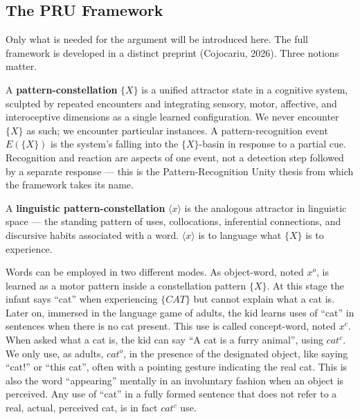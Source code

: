 \documentclass[12pt,a4paper]{article}
\begin{document}
\subsection{The PRU Framework}\label{the-pru-framework}

Only what is needed for the argument will be introduced here. The full framework is developed in a distinct preprint (Cojocariu, 2026). Three notions matter.

A \textbf{pattern-constellation} \(\{X\}\) is a unified attractor state in a cognitive system, sculpted by repeated encounters and integrating sensory, motor, affective, and interoceptive dimensions as a single learned configuration. We never encounter \(\{X\}\) as such; we encounter particular instances. A pattern-recognition event \(E(\{X\})\) is the system's falling into the \(\{X\}\)-basin in response to a partial cue. Recognition and reaction are aspects of one event, not a detection step followed by a separate response --- this is the Pattern-Recognition Unity thesis from which the framework takes its name.

A \textbf{linguistic pattern-constellation} \(\langle x \rangle\) is the analogous attractor in linguistic space --- the standing pattern of uses, collocations, inferential connections, and discursive habits associated with a word. \(\langle x \rangle\) is to language what \(\{X\}\) is to experience.

Words can be employed in two different modes. As object-word, noted \(x^o\), is learned as a motor pattern inside a constellation pattern \(\{X\}\). At this stage the infant says ``cat'' when experiencing \(\{CAT\}\) but cannot explain what a cat is. Later on, immersed in the language game of adults, the kid learns uses of ``cat'' in sentences when there is no cat present. This use is called concept-word, noted \(x^c\). When asked what a cat is, the kid can say ``A cat is a furry animal'', using \(cat^c\). We only use, as adults, \(cat^o\), in the presence of the designated object, like saying ``cat!'' or ``this cat'', often with a pointing gesture indicating the real cat. This is also the word ``appearing'' mentally in an involuntary fashion when an object is perceived. Any use of ``cat'' in a fully formed sentence that does not refer to a real, actual, perceived cat, is in fact \(cat^c\) use.
\end{document}
